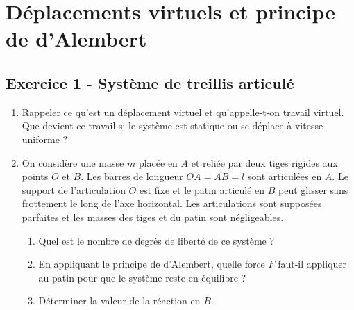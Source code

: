 \documentclass[12pt,a4paper]{article}
\begin{document}
\newpage

\section{Déplacements virtuels et principe de d'Alembert}

\subsection*{Exercice 1 - Système de treillis articulé \niveau{\moyen}}

\begin{boiteexercice}
\begin{enumerate}
  \item Rappeler ce qu'est un déplacement virtuel et qu'appelle-t-on travail virtuel. Que devient ce travail si le système est statique ou se déplace à vitesse uniforme ?

  \item On considère une masse $m$ placée en $A$ et reliée par deux tiges rigides aux points $O$ et $B$. Les barres de longueur $OA = AB = l$ sont articulées en $A$. Le support de l'articulation $O$ est fixe et le patin articulé en $B$ peut glisser sans frottement le long de l'axe horizontal. Les articulations sont supposées parfaites et les masses des tiges et du patin sont négligeables.
  \begin{enumerate}
    \item[a)] Quel est le nombre de degrés de liberté de ce système ?
    \item[b)] En appliquant le principe de d'Alembert, quelle force $F$ faut-il appliquer au patin pour que le système reste en équilibre ?
    \item[c)] Déterminer la valeur de la réaction en $B$.
  \end{enumerate}
\end{enumerate}
\end{boiteexercice}
\end{document}

